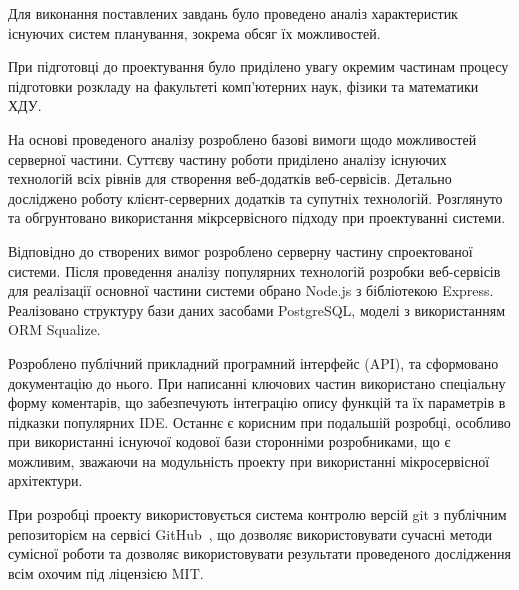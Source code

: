 
Для виконання поставлених завдань було проведено аналіз характеристик існуючих систем планування, зокрема обсяг їх можливостей.

При підготовці до проектування було приділено увагу окремим частинам процесу підготовки розкладу на факультеті комп’ютерних наук, фізики та математики ХДУ.

На основі проведеного аналізу розроблено базові вимоги щодо можливостей серверної частини. Суттєву частину роботи приділено аналізу існуючих технологій всіх рівнів для створення веб-додатків веб-сервісів. Детально досліджено роботу клієнт-серверних додатків та супутніх технологій. Розглянуто та обгрунтовано використання мікрсервісного підходу при проектуванні системи. 

Відповідно до створених вимог розроблено серверну частину спроектованої системи. Після проведення аналізу популярних технологій розробки веб-сервісів для реалізації основної частини системи обрано Node.js з бібліотекою Express. Реалізовано структуру бази даних засобами PostgreSQL, моделі з використанням ORM Squalize.

Розроблено публічний прикладний програмний інтерфейс (API), та сформовано документацію до нього. При написанні ключових частин використано спеціальну форму коментарів, що забезпечують інтеграцію опису функцій та їх параметрів в підказки популярних IDE. Останнє є корисним при подальшій розробці, особливо при використанні існуючої кодової бази сторонніми розробниками, що є можливим, зважаючи на модульність проекту при використанні мікросервісної архітектури.

При розробці проекту використовується система контролю версій git з публічним репозиторієм на сервісі GitHub~\cite{gCalShedule}, що дозволяє використовувати сучасні методи сумісної роботи та дозволяє використовувати результати проведеного дослідження всім охочим під ліцензією MIT.
